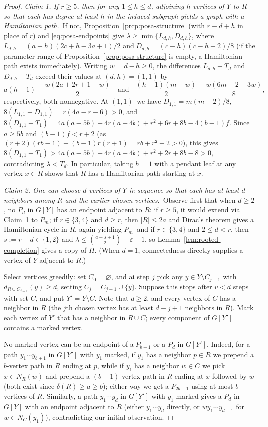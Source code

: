 \documentclass[10pt]{article}
\theoremstyle{compactplain}
\theoremstyle{remark}\newtheorem{remark}[theorem]{Remark}
\begin{document}
\begin{proof}
\medskip\noindent\emph{Claim 1. If $r\ge5$, then for any $1\le h\le d$,
adjoining $h$ vertices of $Y$ to $R$ so that each has degree at least
$h$ in the induced subgraph yields a graph with a Hamiltonian path.}\ 
If not, Proposition~\ref{prop:posa-structure} (with $r-d+h$ in place of
$r$) and \eqref{eq:posa-endpoints} give
$\lambda\ge\min\{L_{d,h},D_{d,h}\}$, where
$L_{d,h}=(a-h)(2c+h-3a+1)/2$ and $D_{d,h}=(c-h)(c-h+2)/8$ (if the
parameter range of Proposition~\ref{prop:posa-structure} is empty, a
Hamiltonian path exists immediately). Writing $w=d-h\ge0$, the
differences $L_{d,h}-T_d$ and $D_{d,h}-T_d$ exceed their values at
$(d,h)=(1,1)$ by
\[
 a(h-1)+\frac{w(2a+2r+1-w)}{2}
 \quad\text{and}\quad
 \frac{(h-1)(m-w)}{2}+\frac{w(6m-2-3w)}{8},
\]
respectively, both nonnegative. At $(1,1)$, we have $D_{1,1}=m(m-2)/8$,
$8(L_{1,1}-D_{1,1})=r(4a-r-6)>0$, and
$8(D_{1,1}-T_1)=4a(a-5b)+4r(a-4b)+r^2+6r+8b-4(b-1)f$. Since $a\ge5b$ and
$(b-1)f<r+2$ (as $(r+2)(rb-1)-(b-1)r(r+1)=rb+r^2-2>0$), this gives
$8(D_{1,1}-T_1)>4a(a-5b)+4r(a-4b)+r^2+2r+8b-8>0$, contradicting
$\lambda<T_d$. In particular, taking $h=1$ with a pendant leaf at any
vertex $x\in R$ shows that $R$ has a Hamiltonian path starting at $x$.

\medskip\noindent\emph{Claim 2. One can choose $d$ vertices of $Y$ in
sequence so that each has at least $d$ neighbors among $R$ and the
earlier chosen vertices.}\ 
Observe first that when $d\ge2$, no $P_d$ in $G[Y]$ has an endpoint
adjacent to $R$: if $r\ge5$, it would extend via Claim~1 to $P_m$; if
$r\in\{3,4\}$ and $d\ge r$, then $|R|\le2a$ and Dirac's theorem gives a
Hamiltonian cycle in $R$, again yielding $P_m$; and if $r\in\{3,4\}$ and
$2\le d<r$, then $s:=r-d\in\{1,2\}$ and
$\lambda\le\binom{a+s+1}{2}-\varepsilon-1$, so
Lemma~\ref{lem:rooted-completion} gives a copy of $H$. (When $d=1$,
connectedness directly supplies a vertex of $Y$ adjacent to $R$.)

Select vertices greedily: set $C_0=\varnothing$, and at step $j$ pick
any $y\in Y\setminus C_{j-1}$ with $d_{R\cup C_{j-1}}(y)\ge d$, setting
$C_j=C_{j-1}\cup\{y\}$. Suppose this stops after $v<d$ steps with set
$C$, and put $Y'=Y\setminus C$. Note that $d\ge2$, and every vertex of
$C$ has a neighbor in $R$ (the $j$th chosen vertex has at least $d-j+1$
neighbors in $R$). Mark each vertex of $Y'$ that has a neighbor in
$R\cup C$; every component of $G[Y']$ contains a marked vertex.

No marked vertex can be an endpoint of a $P_{b+1}$ or a $P_d$ in
$G[Y']$. Indeed, for a path $y_1\cdots y_{b+1}$ in $G[Y']$ with $y_1$
marked, if $y_1$ has a neighbor $p\in R$ we prepend a $b$-vertex path in
$R$ ending at $p$, while if $y_1$ has a neighbor $w\in C$ we pick
$x\in N_R(w)$ and prepend a $(b-1)$-vertex path in $R$ ending at $x$
followed by $w$ (both exist since $\delta(R)\ge a\ge b$); either way we
get a $P_{2b+1}$ using at most $b$ vertices of $R$. Similarly, a path
$y_1\cdots y_d$ in $G[Y']$ with $y_1$ marked gives a $P_d$ in $G[Y]$
with an endpoint adjacent to $R$ (either $y_1\cdots y_d$ directly, or
$wy_1\cdots y_{d-1}$ for $w\in N_C(y_1)$), contradicting our initial
observation.


\end{proof}
\end{document}
